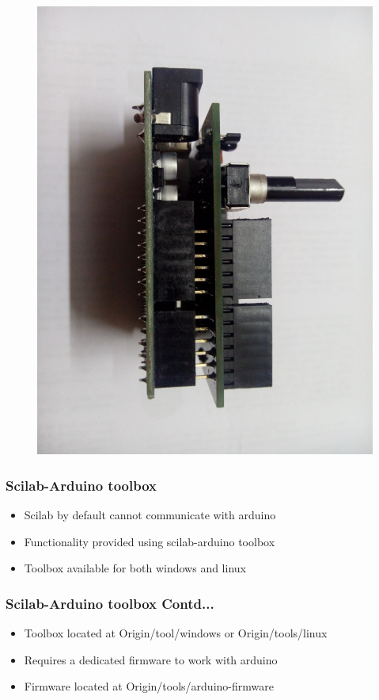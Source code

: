 \documentclass[17pt,xcolor=table]{beamer}
\begin{document}
\begin{frame}[fragile]
\begin{figure}
\begin{minipage}{0.45\textwidth}
\includegraphics[width=0.9\linewidth, angle=90]{arduino-shield-side.jpg}
\end{minipage}
\end{figure}
\end{frame}


\begin{frame}[fragile]
\frametitle{Scilab-Arduino toolbox}
\begin{itemize}[<+-|alert@+>]
\item Scilab by default cannot communicate with arduino
\item Functionality provided using scilab-arduino toolbox
\item Toolbox available for both windows and linux
\end{itemize}

\end{frame}

\begin{frame}[fragile]
\frametitle{Scilab-Arduino toolbox Contd...}
\begin{itemize}[<+-|alert@+>]
\item Toolbox located at Origin/tool/windows or Origin/tools/linux
\item Requires a dedicated firmware to work with arduino
\item Firmware located at Origin/tools/arduino-firmware
\end{itemize}

\end{frame}
 
\end{document}
